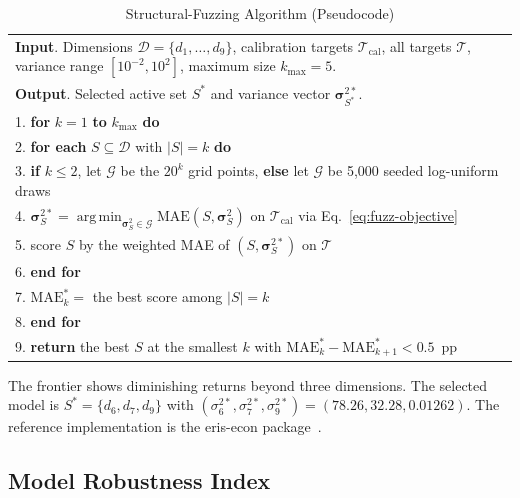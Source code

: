 \documentclass[journal]{IEEEtran}
\DeclareMathOperator*{\argmin}{arg\,min}
\begin{document}
\begin{table}[!t]
\renewcommand{\arraystretch}{1.05}
\caption{Structural-Fuzzing Algorithm (Pseudocode)}
\label{alg:fuzz}
\centering
\begin{tabular}{@{}p{}@{}}
\toprule
\textbf{Input}. Dimensions $\mathcal{D}=\{d_1,\dots,d_9\}$, calibration targets $\mathcal{T}_{\text{cal}}$, all targets $\mathcal{T}$, variance range $[10^{-2},10^{2}]$, maximum size $k_{\max}=5$. \\
\textbf{Output}. Selected active set $S^*$ and variance vector $\boldsymbol{\sigma}_{S^*}^{2*}$. \\
\midrule
1. \textbf{for} $k=1$ \textbf{to} $k_{\max}$ \textbf{do} \\
2. \quad \textbf{for each} $S\subseteq\mathcal{D}$ with $|S|=k$ \textbf{do} \\
3. \quad\quad \textbf{if} $k\le2$, let $\mathcal{G}$ be the $20^{k}$ grid points, \textbf{else} let $\mathcal{G}$ be 5,000 seeded log-uniform draws \\
4. \quad\quad $\boldsymbol{\sigma}^{2*}_{S}=\argmin_{\boldsymbol{\sigma}_S^2\in\mathcal{G}}\mathrm{MAE}(S,\boldsymbol{\sigma}_S^2)$ on $\mathcal{T}_{\text{cal}}$ via Eq.~\eqref{eq:fuzz-objective} \\
5. \quad\quad score $S$ by the weighted MAE of $(S,\boldsymbol{\sigma}^{2*}_{S})$ on $\mathcal{T}$ \\
6. \quad \textbf{end for} \\
7. \quad $\mathrm{MAE}_k^*=$ the best score among $|S|=k$ \\
8. \textbf{end for} \\
9. \textbf{return} the best $S$ at the smallest $k$ with $\mathrm{MAE}_k^*-\mathrm{MAE}_{k+1}^* < 0.5$~pp \\
\bottomrule
\end{tabular}
\end{table}

The frontier shows diminishing returns beyond three dimensions.
The selected model is $S^*=\{d_6,d_7,d_9\}$ with $(\sigma_6^{2*},\sigma_7^{2*},\sigma_9^{2*})=(78.26, 32.28, 0.01262)$.
The reference implementation is the eris-econ package~\cite{eriseconsw}.

\subsection{Model Robustness Index}
\end{document}

